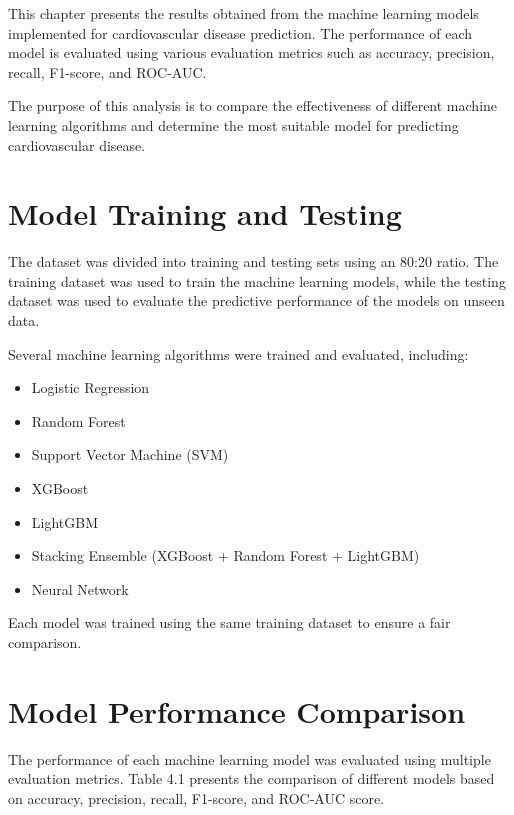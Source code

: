 This chapter presents the results obtained from the machine learning models implemented for cardiovascular disease prediction. The performance of each model is evaluated using various evaluation metrics such as accuracy, precision, recall, F1-score, and ROC-AUC.

The purpose of this analysis is to compare the effectiveness of different machine learning algorithms and determine the most suitable model for predicting cardiovascular disease.

\section{Model Training and Testing}

The dataset was divided into training and testing sets using an 80:20 ratio. The training dataset was used to train the machine learning models, while the testing dataset was used to evaluate the predictive performance of the models on unseen data.

Several machine learning algorithms were trained and evaluated, including:

\begin{itemize}
\item Logistic Regression
\item Random Forest
\item Support Vector Machine (SVM)
\item XGBoost
\item LightGBM
\item Stacking Ensemble (XGBoost + Random Forest + LightGBM)
\item Neural Network
\end{itemize}

Each model was trained using the same training dataset to ensure a fair comparison.

\section{Model Performance Comparison}

The performance of each machine learning model was evaluated using multiple evaluation metrics. Table 4.1 presents the comparison of different models based on accuracy, precision, recall, F1-score, and ROC-AUC score.

